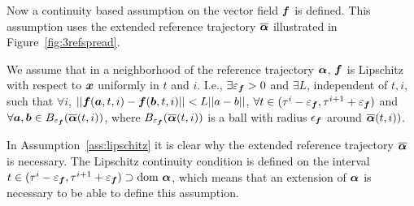 \documentclass[../DC2017114Bouma.tex]{subfiles}
\begin{document}
Now a continuity based assumption on the vector field ${\boldsymbol{f}}$ is defined. This assumption uses the extended reference trajectory $\overline{\boldsymbol{\alpha}}$ illustrated in Figure~\ref{fig:3refspread}.

\begin{myass}\label{ass:lipschitz}
We assume that in a neighborhood of the reference trajectory $\boldsymbol{\alpha}$, ${\boldsymbol{f}}$ is Lipschitz with respect to ${\boldsymbol{x}}$ uniformly in $t$ and $i$. I.e., $\exists\varepsilon_{{\boldsymbol{f}}}>0$ and $\exists L$, independent of $t,i$, such that $\forall i$, $||{\boldsymbol{f}}({\boldsymbol{a}},t,i) - {\boldsymbol{f}}({\boldsymbol{b}},t,i)||<L||a-b||$, $\forall t\in (\tau^i - \varepsilon_{{\boldsymbol{f}}},\tau^{i+1} + \varepsilon_{{\boldsymbol{f}}})$ and $\forall {\boldsymbol{a}},{\boldsymbol{b}}\in B_{\varepsilon_{{\boldsymbol{f}}}}(\overline{\boldsymbol{\alpha}}(t,i))$, where $B_{\varepsilon_{{\boldsymbol{f}}}}(\overline{\boldsymbol{\alpha}}(t,i))$ is a ball with radius $\epsilon_{{\boldsymbol{f}}}$ around $\overline{\boldsymbol{\alpha}}(t,i))$.
\end{myass}

In Assumption~\ref{ass:lipschitz} it is clear why the extended reference trajectory $\overline{\boldsymbol{\alpha}}$ is necessary. The Lipschitz continuity condition is defined on the interval $t \in (\tau^i - \varepsilon_{{\boldsymbol{f}}},\tau^{i+1} + \varepsilon_{{\boldsymbol{f}}}) \supset \text{dom }\boldsymbol{\alpha}$, which means that an extension of $\boldsymbol{\alpha}$ is necessary to be able to define this assumption.
\end{document}
